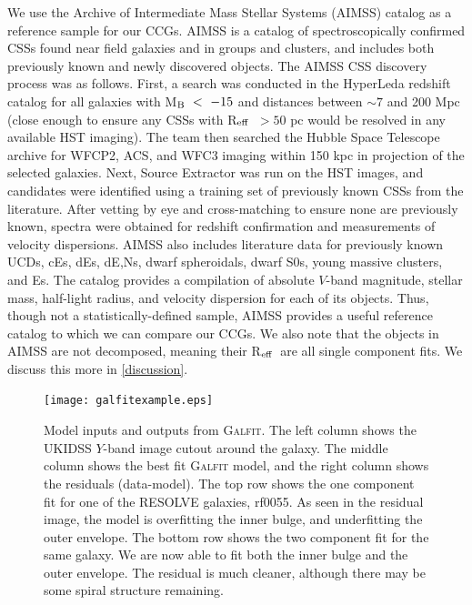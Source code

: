 \documentclass[iop,apj]{emulateapj}
\newcommand{\Reff}{R$_{\rm eff}$}
\begin{document}
  We use the Archive of Intermediate Mass Stellar Systems (AIMSS) catalog \citep{Norris2014,Forbes2014,Janz2015} as a reference sample for our CCGs.  AIMSS is a catalog of spectroscopically confirmed CSSs found near field galaxies and in groups and clusters, and includes both previously known and newly discovered objects. The AIMSS CSS discovery process was as follows. First, a search was conducted in the HyperLeda redshift catalog \citep{Paturel2003} for all galaxies with M$_{\rm B}~<~-15$ and distances between $\sim 7$ and 200 Mpc (close enough to ensure any CSSs with \Reff\ $> 50$ pc would be resolved in any available HST imaging). The team then searched the Hubble Space Telescope archive for WFCP2, ACS, and WFC3 imaging within 150 kpc in projection of the selected galaxies. Next, Source Extractor was run on the HST images, and candidates were identified using a training set of previously known CSSs from the literature. After vetting by eye and cross-matching to ensure none are previously known, spectra were obtained for redshift confirmation and measurements of velocity dispersions. AIMSS also includes literature data for previously known UCDs, cEs, dEs, dE,Ns, dwarf spheroidals, dwarf S0s, young massive clusters, and Es. The catalog provides a compilation of absolute $V$-band magnitude, stellar mass, half-light radius, and velocity dispersion for each of its objects. Thus, though not a statistically-defined sample, AIMSS provides a useful reference catalog to which we can compare our CCGs. We also note that the objects in AIMSS are not decomposed, meaning their \Reff\ are all single component fits. We discuss this more in \autoref{discussion}.

\begin{figure}[b]
\begin{center}
\texttt{[image: galfitexample.eps]}
\caption{Model inputs and outputs from \textsc{Galfit}. The left column shows the UKIDSS $Y$-band image cutout around the galaxy. The middle column shows the best fit \textsc{Galfit} model, and the right column shows the residuals (data-model). The top row shows the one component fit for one of the RESOLVE galaxies, rf0055. As seen in the residual image, the model is overfitting the inner bulge, and underfitting the outer envelope. The bottom row shows the two component fit for the same galaxy. We are now  able to fit both the inner bulge and the outer envelope. The residual is much cleaner, although there may be some spiral structure remaining.}
\label{fig:galfit}
\end{center}
\end{figure}
\end{document}
